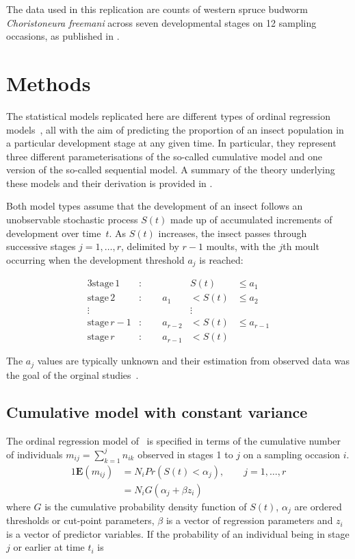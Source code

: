 \begin{table}[tbp]
  \small
    \centering
    \caption{The data used in this replication are counts of western spruce budworm \emph{Choristoneura freemani} across seven developmental stages on 12 sampling occasions, as published in \citep{candy1990biology}.}
  
  \label{tab:tab0}
\end{table}

\section{Methods}
The statistical models replicated here are different types of ordinal regression models~\citep{agresti2010analysis}, all with the aim of predicting the proportion of an insect population in a particular development stage at any given time. 
In particular, they represent three different parameterisations of the so-called cumulative model and one version of the so-called sequential model. 
A summary of the theory underlying these models and their derivation is provided in \citep{burkner2019ordinal}.

Both model types assume that the development of an insect follows an unobservable stochastic process $S(t)$ made up of accumulated increments of development over time~$t$. 
As $S(t)$ increases, the insect passes through successive stages $j=1,\dots,r$, delimited by $r-1$ moults, with the $j$th moult occurring when the development threshold $a_j$ is reached:

\begin{alignat*}{3}
  \mathrm{stage}\,1&:\qquad {}&   S(t) & \leq a_1 \\
  \mathrm{stage}\,2&:\qquad  a_1&< S(t) & \leq a_2 \\
  \vdots & &\vdots \\
  \mathrm{stage}\,r-1&:\qquad  a_{r-2}&< S(t) & \leq a_{r-1} \\
  \mathrm{stage}\,r&:\qquad  a_{r-1}&< S(t) 
\end{alignat*}

The $a_j$ values are typically unknown and their estimation from observed data was the goal of the orginal studies~\citep{dennis1986stochastic,candy1991modeling}.

\subsection{Cumulative model with constant variance }
\label{sec:const_var_cm}
The ordinal regression model of~\citep{candy1991modeling} is specified in terms of the cumulative number of individuals  $m_{ij}=\sum_{k=1}^jn_{ik}$ observed in stages 1 to $j$ on a sampling occasion $i$. 
\begin{alignat}{1}
\mathbf{E}(m_{ij})&=N_iPr(S(t) < \alpha_j), \qquad j = 1,\dots ,r\\
&=N_iG(\alpha_j + \beta z_i)
\end{alignat}
where $G$ is the cumulative probability density function of $S(t)$, $\alpha_j$ are ordered thresholds or cut-point parameters, $\beta$ is a vector of regression parameters and $z_i$ is a vector of predictor variables.
If the probability of an individual being in stage $j$ or earlier at time $t_i$ is 

